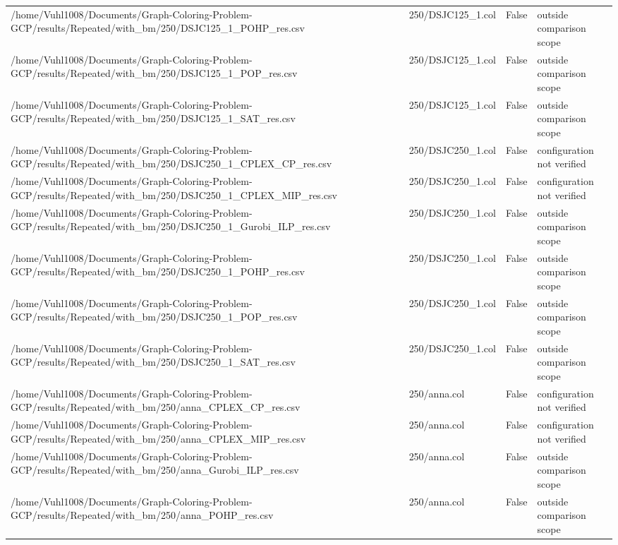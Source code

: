 \begin{table}[htbp]
\begin{tabular}{llll}
/home/Vuhl1008/Documents/Graph-Coloring-Problem-GCP/results/Repeated/with\_bm/250/DSJC125\_1\_POHP\_res.csv & 250/DSJC125\_1.col & False & outside comparison scope \\
/home/Vuhl1008/Documents/Graph-Coloring-Problem-GCP/results/Repeated/with\_bm/250/DSJC125\_1\_POP\_res.csv & 250/DSJC125\_1.col & False & outside comparison scope \\
/home/Vuhl1008/Documents/Graph-Coloring-Problem-GCP/results/Repeated/with\_bm/250/DSJC125\_1\_SAT\_res.csv & 250/DSJC125\_1.col & False & outside comparison scope \\
/home/Vuhl1008/Documents/Graph-Coloring-Problem-GCP/results/Repeated/with\_bm/250/DSJC250\_1\_CPLEX\_CP\_res.csv & 250/DSJC250\_1.col & False & configuration not verified \\
/home/Vuhl1008/Documents/Graph-Coloring-Problem-GCP/results/Repeated/with\_bm/250/DSJC250\_1\_CPLEX\_MIP\_res.csv & 250/DSJC250\_1.col & False & configuration not verified \\
/home/Vuhl1008/Documents/Graph-Coloring-Problem-GCP/results/Repeated/with\_bm/250/DSJC250\_1\_Gurobi\_ILP\_res.csv & 250/DSJC250\_1.col & False & outside comparison scope \\
/home/Vuhl1008/Documents/Graph-Coloring-Problem-GCP/results/Repeated/with\_bm/250/DSJC250\_1\_POHP\_res.csv & 250/DSJC250\_1.col & False & outside comparison scope \\
/home/Vuhl1008/Documents/Graph-Coloring-Problem-GCP/results/Repeated/with\_bm/250/DSJC250\_1\_POP\_res.csv & 250/DSJC250\_1.col & False & outside comparison scope \\
/home/Vuhl1008/Documents/Graph-Coloring-Problem-GCP/results/Repeated/with\_bm/250/DSJC250\_1\_SAT\_res.csv & 250/DSJC250\_1.col & False & outside comparison scope \\
/home/Vuhl1008/Documents/Graph-Coloring-Problem-GCP/results/Repeated/with\_bm/250/anna\_CPLEX\_CP\_res.csv & 250/anna.col & False & configuration not verified \\
/home/Vuhl1008/Documents/Graph-Coloring-Problem-GCP/results/Repeated/with\_bm/250/anna\_CPLEX\_MIP\_res.csv & 250/anna.col & False & configuration not verified \\
/home/Vuhl1008/Documents/Graph-Coloring-Problem-GCP/results/Repeated/with\_bm/250/anna\_Gurobi\_ILP\_res.csv & 250/anna.col & False & outside comparison scope \\
/home/Vuhl1008/Documents/Graph-Coloring-Problem-GCP/results/Repeated/with\_bm/250/anna\_POHP\_res.csv & 250/anna.col & False & outside comparison scope \\

\end{tabular}
\end{table}
